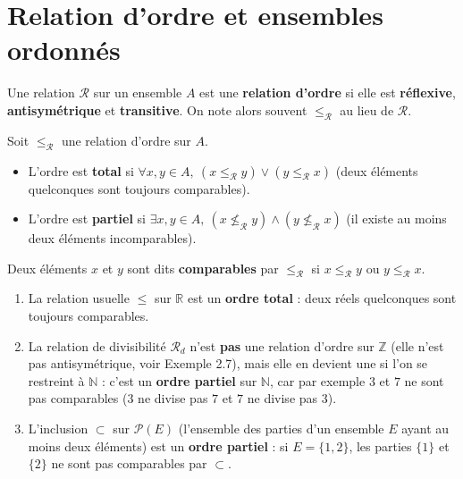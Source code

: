 \documentclass[a4paper,12pt,openany]{book}
\begin{document}
\section{Relation d'ordre et ensembles ordonnés}


\begin{definition}
Une relation $\mathcal{R}$ sur un ensemble $A$ est une \textbf{relation
d'ordre} si elle est \textbf{réflexive}, \textbf{antisymétrique} et
\textbf{transitive}. On note alors souvent $\leq_{\mathcal{R}}$ au lieu de
$\mathcal{R}$.
\end{definition}

\begin{definition}
Soit $\leq_{\mathcal{R}}$ une relation d'ordre sur $A$.
\begin{itemize}
  \item L'ordre est \textbf{total} si $\forall x,y \in A,\ (x
  \leq_{\mathcal{R}} y) \vee (y \leq_{\mathcal{R}} x)$ (deux éléments
  quelconques sont toujours comparables).
  \item L'ordre est \textbf{partiel} si $\exists x,y \in A,\
  (x\not\leq_{\mathcal{R}} y) \wedge (y \not\leq_{\mathcal{R}} x)$ (il existe
  au moins deux éléments incomparables).
\end{itemize}
Deux éléments $x$ et $y$ sont dits \textbf{comparables} par
$\leq_{\mathcal{R}}$ si $x\leq_{\mathcal{R}} y$ ou $y\leq_{\mathcal{R}} x$.
\end{definition}

\begin{exemple}
\begin{enumerate}
  \item La relation usuelle $\leq$ sur $\mathbb{R}$ est un \textbf{ordre
  total} : deux réels quelconques sont toujours comparables.
  \item La relation de divisibilité $\mathcal{R}_d$ n'est \textbf{pas} une
  relation d'ordre sur $\mathbb{Z}$ (elle n'est pas antisymétrique, voir
  Exemple 2.7), mais elle en devient une si l'on se restreint à
  $\mathbb{N}$ : c'est un \textbf{ordre partiel} sur $\mathbb{N}$, car par
  exemple $3$ et $7$ ne sont pas comparables ($3$ ne divise pas $7$ et $7$ ne
  divise pas $3$).
  \item L'inclusion $\subset$ sur $\mathcal{P}(E)$ (l'ensemble des parties
  d'un ensemble $E$ ayant au moins deux éléments) est un \textbf{ordre
  partiel} : si $E=\{1,2\}$, les parties $\{1\}$ et $\{2\}$ ne sont pas
  comparables par $\subset$.
\end{enumerate}
\end{exemple}
\end{document}
